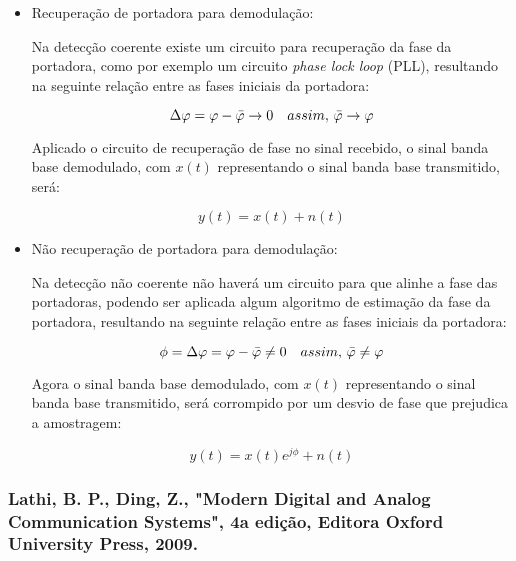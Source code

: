 \begin{itemize}
    \item Recuperação de portadora para demodulação:
    
    Na detecção coerente existe um circuito para recuperação da fase da portadora, como por exemplo um circuito \textit{phase lock loop} (PLL), resultando na seguinte relação entre as fases iniciais da portadora:
    
    \begin{equation}
        \Delta \varphi = \varphi - \Bar{\varphi} \to 0 \, \, \, \, \, \, assim, \, \Bar{\varphi} \to \varphi
    \end{equation}

    Aplicado o circuito de recuperação de fase no sinal recebido, o sinal banda base demodulado, com $x(t)$ representando o sinal banda base transmitido, será:
    
    \begin{equation}
        y(t) = x(t) + n(t)
    \end{equation}
    
    \item Não recuperação de portadora para demodulação:
    
    Na detecção não coerente não haverá um circuito para que alinhe a fase das portadoras, podendo ser aplicada algum algoritmo de estimação da fase da portadora, resultando na seguinte relação entre as fases iniciais da portadora:
    
    \begin{equation}
        \phi = \Delta \varphi = \varphi - \Bar{\varphi} \neq 0 \, \, \, \, \, \, assim, \, \Bar{\varphi} \neq \varphi
    \end{equation}

    Agora o sinal banda base demodulado, com $x(t)$ representando o sinal banda base transmitido, será corrompido por um desvio de fase que prejudica a amostragem:
    
    \begin{equation}
        y(t) = x(t)e^{j\phi} + n(t)
    \end{equation}
\end{itemize}



\subsubsection*{Lathi, B. P., Ding, Z., "Modern Digital and Analog Communication Systems", 4a edição, Editora Oxford University Press, 2009.}



